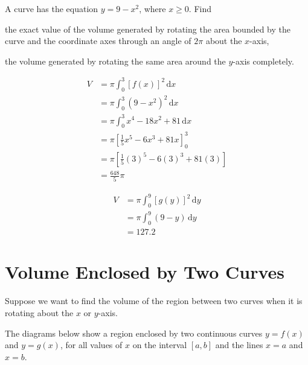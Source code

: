 \documentclass[11pt,a4paper]{book}
\begin{document}
\begin{example}

A curve has the equation $y=9-x^{2}$, where $x\geq0$. Find

\begin{tasks}[label=(\alph*),label-width=3.5ex]

\task the exact value of the volume generated by rotating the area
bounded by the curve and the coordinate axes through an angle of $2\pi$
about the $x$-axis,

\task the volume generated by rotating the same area around the $y$-axis
completely.

\end{tasks}

\Solution

\begin{tasks}[label=(\alph*),label-width=3.5ex]

\task
\begin{align*}
V & =\pi\int_{0}^{3}\left[f(x)\right]^{2}\,\mathrm{d}x\\
 & =\pi\int_{0}^{3}(9-x^{2})^{2}\,\mathrm{d}x\\
 & =\pi\int_{0}^{3}x^{4}-18x^{2}+81\,\mathrm{d}x\\
 & =\pi\left[\frac{1}{5}x^{5}-6x^{3}+81x\right]_{0}^{3}\\
 & =\pi\left[\frac{1}{5}(3)^{5}-6(3)^{3}+81(3)\right]\\
 & =\frac{648}{5}\pi
\end{align*}

\task
\begin{align*}
V & =\pi\int_{0}^{9}\left[g(y)\right]^{2}\,\mathrm{d}y\\
 & =\pi\int_{0}^{9}(9-y)\,\mathrm{d}y\\
 & =127.2
\end{align*}

\end{tasks}

\end{example}

\newpage{}

\section{Volume Enclosed by Two Curves}

Suppose we want to find the volume of the region between two curves
when it is rotating about the $x$ or $y$-axis.

The diagrams below show a region enclosed by two continuous curves
$y=f(x)$ and $y=g(x)$, for all values of $x$ on the interval $[a,b]$
and the lines $x=a$ and $x=b$.
\end{document}
